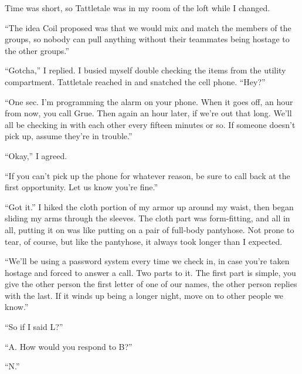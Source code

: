 





Time was short, so Tattletale was in my room of the loft while I changed.



``The idea Coil proposed was that we would mix and match the members of the groups, so nobody can pull anything without their teammates being hostage to the other groups.''



``Gotcha,'' I replied.  I busied myself double checking the items from the utility compartment.  Tattletale reached in and snatched the cell phone.  ``Hey?''



``One sec.  I'm programming the alarm on your phone.  When it goes off, an hour from now, you call Grue.  Then again an hour later, if we're out that long.  We'll all be checking in with each other every fifteen minutes or so.  If someone doesn't pick up, assume they're in trouble.''



``Okay,'' I agreed.



``If you can't pick up the phone for whatever reason, be sure to call back at the first opportunity.  Let us know you're fine.''



``Got it.''  I hiked the cloth portion of my armor up around my waist, then began sliding my arms through the sleeves.  The cloth part was form-fitting, and all in all, putting it on was like putting on a pair of full-body pantyhose.  Not prone to tear, of course, but like the pantyhose, it always took longer than I expected.



``We'll be using a password system every time we check in, in case you're taken hostage and forced to answer a call.  Two parts to it.  The first part is simple, you give the other person the first letter of one of our names, the other person replies with the last.  If it winds up being a longer night, move on to other people we know.''



``So if I said L?''



``A.  How would you respond to B?''



``N.''



